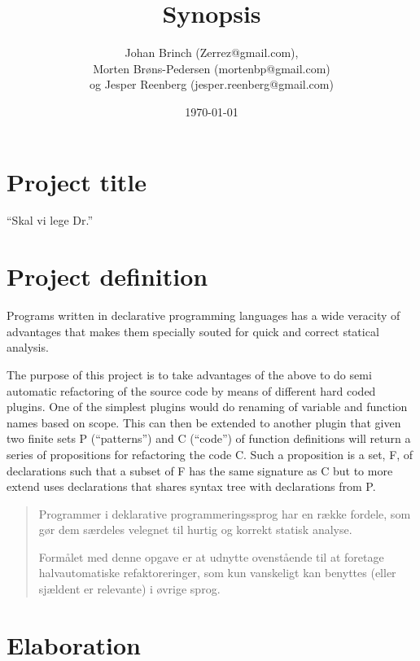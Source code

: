 \documentclass[a4paper,oneside]{memoir}
\title{Synopsis}
\author{Johan Brinch (Zerrez@gmail.com), \\
Morten Brøns-Pedersen (mortenbp@gmail.com) \\ og
Jesper Reenberg (jesper.reenberg@gmail.com)}
\date{\today}
\begin{document}
\maketitle

\section{Project title}

``Skal vi lege Dr.''

\section{Project definition}

Programs written in declarative programming languages has a wide veracity of
advantages that makes them specially souted for quick and correct statical
analysis.


The purpose of this project is to take advantages of the above to do semi
automatic refactoring of the source code by means of different hard coded
plugins. One of the simplest plugins would do renaming of variable and function
names based on scope. This can then be extended to another plugin that given two
finite sets P (``patterns'') and C (``code'') of function definitions will
return a series of propositions for refactoring the code C. Such a proposition
is a set, F, of declarations such that a subset of F has the same signature as
C but to more extend uses declarations that shares syntax tree with declarations
from P.







\begin{quotation}
  Programmer i deklarative programmeringssprog har en række fordele, som gør dem
  særdeles velegnet til hurtig og korrekt statisk analyse.

  Formålet med denne opgave er at udnytte ovenstående til at foretage
  halvautomatiske refaktoreringer, som kun vanskeligt kan benyttes (eller
  sjældent er relevante) i øvrige sprog.
\end{quotation}

\section{Elaboration}
\end{document}
